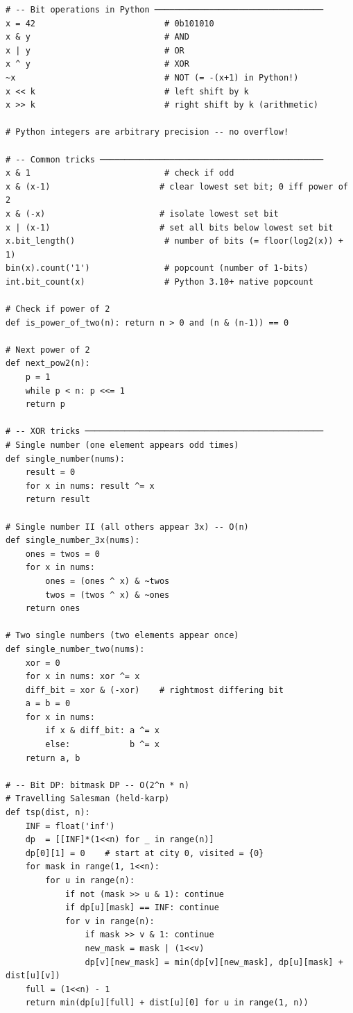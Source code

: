 \documentclass[11pt,a4paper]{report}
\begin{document}
\begin{lstlisting}
# -- Bit operations in Python ──────────────────────────────────
x = 42                          # 0b101010
x & y                           # AND
x | y                           # OR
x ^ y                           # XOR
~x                              # NOT (= -(x+1) in Python!)
x << k                          # left shift by k
x >> k                          # right shift by k (arithmetic)

# Python integers are arbitrary precision -- no overflow!

# -- Common tricks ─────────────────────────────────────────────
x & 1                           # check if odd
x & (x-1)                      # clear lowest set bit; 0 iff power of 2
x & (-x)                       # isolate lowest set bit
x | (x-1)                      # set all bits below lowest set bit
x.bit_length()                  # number of bits (= floor(log2(x)) + 1)
bin(x).count('1')               # popcount (number of 1-bits)
int.bit_count(x)                # Python 3.10+ native popcount

# Check if power of 2
def is_power_of_two(n): return n > 0 and (n & (n-1)) == 0

# Next power of 2
def next_pow2(n):
    p = 1
    while p < n: p <<= 1
    return p

# -- XOR tricks ────────────────────────────────────────────────
# Single number (one element appears odd times)
def single_number(nums):
    result = 0
    for x in nums: result ^= x
    return result

# Single number II (all others appear 3x) -- O(n)
def single_number_3x(nums):
    ones = twos = 0
    for x in nums:
        ones = (ones ^ x) & ~twos
        twos = (twos ^ x) & ~ones
    return ones

# Two single numbers (two elements appear once)
def single_number_two(nums):
    xor = 0
    for x in nums: xor ^= x
    diff_bit = xor & (-xor)    # rightmost differing bit
    a = b = 0
    for x in nums:
        if x & diff_bit: a ^= x
        else:            b ^= x
    return a, b

# -- Bit DP: bitmask DP -- O(2^n * n)
# Travelling Salesman (held-karp)
def tsp(dist, n):
    INF = float('inf')
    dp  = [[INF]*(1<<n) for _ in range(n)]
    dp[0][1] = 0    # start at city 0, visited = {0}
    for mask in range(1, 1<<n):
        for u in range(n):
            if not (mask >> u & 1): continue
            if dp[u][mask] == INF: continue
            for v in range(n):
                if mask >> v & 1: continue
                new_mask = mask | (1<<v)
                dp[v][new_mask] = min(dp[v][new_mask], dp[u][mask] + dist[u][v])
    full = (1<<n) - 1
    return min(dp[u][full] + dist[u][0] for u in range(1, n))


\end{lstlisting}
\end{document}

